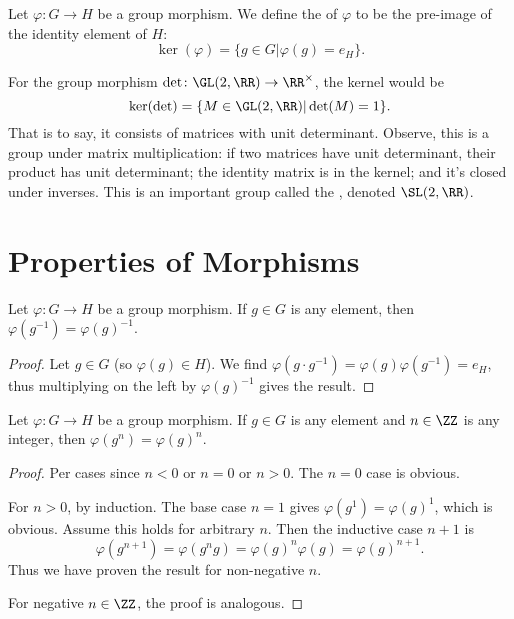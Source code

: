 \begin{definition}
  Let $\varphi\colon G\to H$ be a group morphism. We define the
   of $\varphi$ to be the pre-image of the identity
  element of $H$:
  \begin{equation*}
    \ker(\varphi)=\{g\in G|\varphi(g)=e_{H}\}.
  \end{equation*}
\end{definition}

\begin{example}
  For the group morphism $\det\colon\GL(2,\RR)\to\RR^{\times}$, the
  kernel would be
  \begin{equation}
    \ker(\det)=\{M\in\GL(2,\RR)|\det(M)=1\}.
  \end{equation}
  That is to say, it consists of matrices with unit
  determinant. Observe, this is a group under matrix multiplication: if
  two matrices have unit determinant, their product has unit
  determinant; the identity matrix is in the kernel; and it's closed
  under inverses. This is an important group called the
  , denoted $\SL(2,\RR)$.
\end{example}

\section{Properties of Morphisms}

\begin{proposition}
  Let $\varphi\colon G\to H$ be a group morphism.
  If $g\in G$ is any element, then $\varphi(g^{-1})=\varphi(g)^{-1}$.
\end{proposition}

\begin{proof}
  Let $g\in G$ (so $\varphi(g)\in H$).
  We find $\varphi(g\cdot g^{-1})=\varphi(g)\varphi(g^{-1})=e_{H}$,
  thus multiplying on the left by $\varphi(g)^{-1}$ gives the result.
\end{proof}

\begin{proposition}
  Let $\varphi\colon G\to H$ be a group morphism.
  If $g\in G$ is any element and $n\in\ZZ$ is any integer,
  then $\varphi(g^{n})=\varphi(g)^{n}$.
\end{proposition}

\begin{proof}
  Per cases since $n<0$ or $n=0$ or $n>0$. The $n=0$ case is obvious.

  For $n>0$, by induction. The base case $n=1$ gives
  $\varphi(g^{1})=\varphi(g)^{1}$, which is obvious. Assume this holds
  for arbitrary $n$. Then the inductive case $n+1$ is
  \begin{equation}
    \varphi(g^{n+1})=\varphi(g^{n}g)=\varphi(g)^{n}\varphi(g)=\varphi(g)^{n+1}.
  \end{equation}
  Thus we have proven the result for non-negative $n$.

  For negative $n\in\ZZ$, the proof is analogous.
\end{proof}

